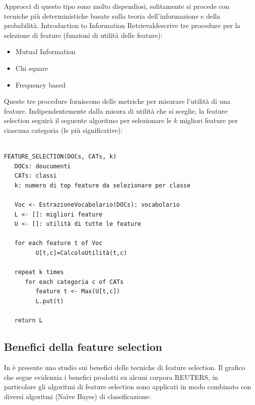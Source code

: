 \documentclass{article}
\theoremstyle{plain}
\theoremstyle{definition}
\begin{document}
Approcci di questo tipo sono molto dispendiosi, solitamente si procede con tecniche più deterministiche basate sulla teoria dell'informazione e della probabilità. Introduction to Information Retrieval\footnotemark descrive tre procedure per la selezione di feature (funzioni di utilità delle feature):
\begin{itemize}  
\item Mutual Information
\item Chi square
\item Frequency based
\end{itemize}
Queste tre procedure forniscono delle metriche per misurare l'utilità di una feature. Indipendentemente dalla misura di utilità che si sceglie, la feature selection seguirà il seguente algoritmo per selezionare le $k$ migliori feature per ciascuna categoria (le più significative):
\\
\\
\begin{verbatim}
FEATURE_SELECTION(DOCs, CATs, k)
   DOCs: doucumenti
   CATs: classi
   k: numero di top feature da selezionare per classe 
   
   Voc <- EstrazioneVocabolario(DOCs): vocabolario
   L <- []: migliori feature
   U <- []: utilità di tutte le feature   
   
   for each feature t of Voc
         U[t,c]=CalcoloUtilità(t,c)
   
   repeat k times      
      for each categoria c of CATs
         feature t <- Max(U[t,c])       
         L.put(t)
   
   return L
\end{verbatim} 

\newpage
\subsection{Benefici della feature selection}
In  è presente uno studio sui benefici delle tecniche di feature selection. Il grafico che segue evidenzia i benefici prodotti su alcuni corpora REUTERS, in particolare gli algoritmi di feature selection sono applicati in modo combinato con diversi algoritmi (Naïve Bayes) di classificazione:
\end{document}
